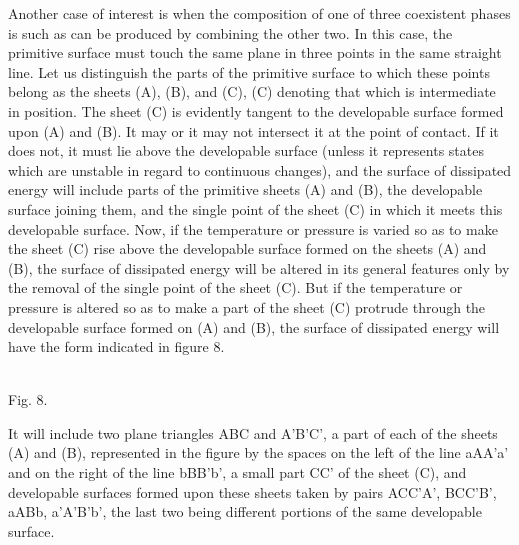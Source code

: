 \documentclass[11pt]{article}
\begin{document}
Another case of interest is when the composition of one of three coexistent phases is such as can be produced by combining the other two. In this case, the primitive surface must touch the same plane in three points in the same straight line. Let us distinguish the parts of the primitive surface to which these points belong as the sheets (A), (B), and (C), (C) denoting that which is intermediate in position. The sheet (C) is evidently tangent to the developable surface formed upon (A) and (B). It may or it may not intersect it at the point of contact. If it does not, it must lie above the developable surface (unless it represents states which are unstable in regard to continuous changes), and the surface of dissipated energy will include parts of the primitive sheets (A) and (B), the developable surface joining them, and the single point of the sheet (C) in which it meets this developable surface. Now, if the temperature or pressure is varied so as to make the sheet (C) rise above the developable surface formed on the sheets (A) and (B), the surface of dissipated energy will be altered in its general features only by the removal of the single point of the sheet (C). But if the temperature or pressure is altered so as to make a part of the sheet (C) protrude through the developable surface formed on (A) and (B), the surface of dissipated energy will have the form indicated in figure 8.

\begin{center}\label{fig:gibbs-v1-p3-fig8}
\\[-0.15em]
{\small Fig. 8.}
\end{center}

It will include two plane triangles ABC and A'B'C', a part of each of the sheets (A) and (B), represented in the figure by the spaces on the left of the line aAA'a' and on the right of the line bBB'b', a small part CC' of the sheet (C), and developable surfaces formed upon these sheets taken by pairs ACC'A', BCC'B', aABb, a'A'B'b', the last two being different portions of the same developable surface.
\end{document}
